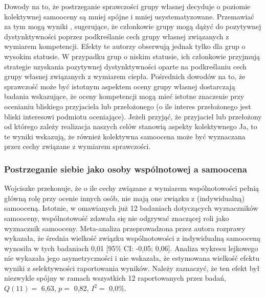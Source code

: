 \documentclass[man]{apa6}
\begin{document}
Dowody na to, że postrzeganie sprawczości grupy własnej decyduje o poziomie kolektywnej samooceny są mniej spójne i mniej usystematyzowane. Przemawiać za tym mogą wyniki \textcite{oldmeadow2010social}, sugerujące, że członkowie grupy mogą dążyć do pozytywnej dystynktywności poprzez podkreślanie cech grupy własnej związanych z wymiarem kompetencji. Efekty te autorzy obserwują jednak tylko dla grup o wysokim statusie. W przypadku grup o niskim statusie, ich członkowie przyjmują strategie uzyskania pozytywnej dystynktywności oparte na podkreślaniu cech grupy własnej związanych z wymiarem ciepła. Pośrednich dowodów na to, że sprawczość może być istotnym aspektem oceny grupy własnej dostarczają badania \textcite{wojciszke2008primacy} wskazujące, że oceny kompetencji mogą mieć istotne znaczenie przy ocenianiu bliskiego przyjaciela lub przełożonego (o ile interes przełożonego jest bliski interesowi podmiotu oceniające). Jeżeli przyjąć, że przyjaciel lub przełożony od którego zależy realizacja naszych celów stanowią aspekty kolektywnego Ja, to te wyniki wskazują, że również kolektywna samoocena może być wyznaczana przez cechy związane z wymiarem sprawczości.

\subsubsection{Postrzeganie siebie jako osoby wspólnotowej a samoocena}

Wojciszke \parencite[np.,][]{wojciszke2006perspektywa} przekonuje, że o ile cechy związane z wymiarem wspólnotowości pełnią główną rolę przy ocenie innych osób, nie mają one związku z (indywidualną) samooceną. Istotnie, w omawianych już 12 badaniach dotyczących wyznaczników samooceny, wspólnotowość zdawała się nie odgrywać znaczącej roli jako wyznacznik samooceny. Meta-analiza przeprowadzona przez autora rozprawy wykazała, że średnia wielkość związku wspólnotowości z indywidualną samooceną wynosiła w tych badaniach 0,01 [95\% CI: -0,05; 0,06]. Analiza wykresu lejkowego nie wykazała jego asymetryczności i nie wskazała, że estymowana wielkość efektu wyniki z selektywności raportowania wyników. Należy zaznaczyć, że ten efekt był niezwykle spójny w ramach wszystkich 12 raportowanych przez \textcite{wojciszke2010sprawczosc} badań, $Q(11) = $ 6,63, $p = $ 0,82, $I^2 = $ 0,0\%. \\
\end{document}
